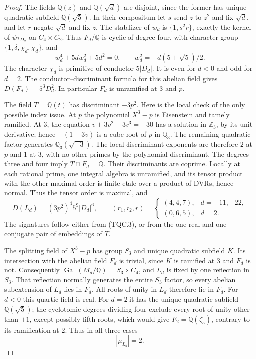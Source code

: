 \begin{proof}
The fields $\mathbb Q(z)$ and $\mathbb Q(\sqrt d)$ are disjoint,
since the former has unique quadratic subfield $\mathbb Q(\sqrt5)$.
In their compositum let $s$ send $z$ to $z^2$ and fix $\sqrt d$,
and let $r$ negate $\sqrt d$ and fix $z$.
The stabilizer of $w_d$ is $\{1,s^2r\}$, exactly the kernel of
$\psi\tau_{D_d}$ on $C_4\times C_2$.
Thus $F_d/\mathbb Q$ is cyclic of degree four, with character group
$\{1,\delta,\chi_d,\bar\chi_d\}$, and
\[
 w_d^4+5d w_d^2+5d^2=0,\qquad
 w_d^2=-d(5\pm\sqrt5)/2.
 \tag{TQC.3}
\]
The character $\chi_d$ is primitive of conductor $5|D_d|$.
It is even for $d<0$ and odd for $d=2$.
The conductor--discriminant formula for this abelian field gives
$D(F_d)=5^3D_d^2$.  In particular $F_d$ is unramified at $3$ and $p$.

The field $T=\mathbb Q(t)$ has discriminant $-3p^2$.
Here is the local check of the only possible index issue.
At $p$ the polynomial $X^3-p$ is Eisenstein and tamely ramified.
At $3$, the equation $v+3v^2+3v^3=-30$ has a solution in
$\mathbb Z_3$, by its unit derivative; hence $-(1+3v)$ is a
cube root of $p$ in $\mathbb Q_3$.
The remaining quadratic factor generates $\mathbb Q_3(\sqrt{-3})$.
The local discriminant exponents are therefore $2$ at $p$ and $1$
at $3$, with no other primes by the polynomial discriminant.
The degrees three and four imply $T\cap F_d=\mathbb Q$.
Their discriminants are coprime.  Locally at each rational prime,
one integral algebra is unramified, and its tensor product with
the other maximal order is finite etale over a product of DVRs,
hence normal.  Thus the tensor order is maximal, and
\[
 D(L_d)=(3p^2)^4 5^9|D_d|^6,
 \qquad
 (r_1,r_2,r)=
 \begin{cases}(4,4,7),&d=-11,-22,\\(0,6,5),&d=2.
 \end{cases}
 \tag{TQC.4}
\]
The signatures follow either from (TQC.3), or from the one real
and one conjugate pair of embeddings of $T$.

The splitting field of $X^3-p$ has group $S_3$ and unique quadratic
subfield $K$.  Its intersection with the abelian field $F_d$ is
trivial, since $K$ is ramified at $3$ and $F_d$ is not.
Consequently $\operatorname{Gal}(M_d/\mathbb Q)=S_3\times C_4$,
and $L_d$ is fixed by one reflection in $S_3$.
That reflection normally generates the entire $S_3$ factor, so
every abelian subextension of $L_d$ lies in $F_d$.
All roots of unity in $L_d$ therefore lie in $F_d$.
For $d<0$ this quartic field is real.  For $d=2$ it has the unique
quadratic subfield $\mathbb Q(\sqrt5)$; the cyclotomic degrees
dividing four exclude every root of unity other than $\pm1$,
except possibly fifth roots, which would give
$F_2=\mathbb Q(\zeta_5)$, contrary to its ramification at $2$.
Thus in all three cases
\[
                         |\mu_{L_d}|=2.
 \tag{TQC.5}
\]


\end{proof}
